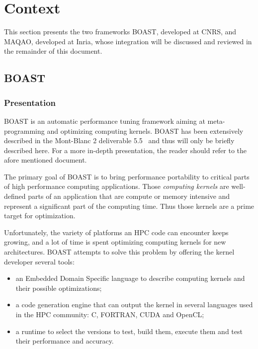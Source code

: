 \documentclass[11pt, a4paper, twoside]{montblanc2}
\begin{document}
\section{Context}\label{sec:context}

This section presents the two frameworks BOAST, developed at CNRS, and MAQAO, 
developed at Inria, whose integration will be discussed and reviewed in the 
remainder of this document.

\subsection{BOAST}

\subsubsection{Presentation}

BOAST is an automatic performance tuning framework aiming at meta-programming and optimizing computing kernels.
BOAST has been extensively described in the Mont-Blanc 2 deliverable 5.5~\cite{tichadou15} and thus will only be briefly described here.
For a more in-depth presentation, the reader should refer to the afore mentioned document.

The primary goal of BOAST is to bring performance portability to critical parts of high performance computing applications.
Those \emph{computing kernels} are well-defined parts of an application that are compute or memory intensive and represent a significant part of the computing time. Thus those kernels are a prime target for optimization.

Unfortunately, the variety of platforms an HPC code can encounter keeps growing, and a lot of time is spent optimizing computing kernels for new architectures.
BOAST attempts to solve this problem by offering the kernel developer several tools:
\begin{itemize}
  \item an Embedded Domain Specific language to describe computing kernels and their possible optimizations;
  \item a code generation engine that can output the kernel in several languages used in the HPC community: C, FORTRAN, CUDA and OpenCL;
  \item a runtime to select the versions to test, build them, execute them and test their performance and accuracy.
\end{itemize}
\end{document}
